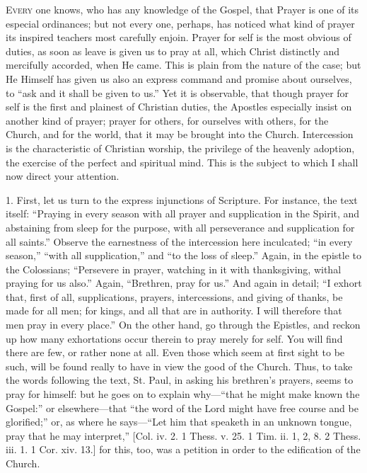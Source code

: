 E\textsc{very} one knows, who has any knowledge of the Gospel, that Prayer
is one of its especial ordinances; but not every one, perhaps, has
noticed what kind of prayer its inspired teachers most carefully
enjoin. Prayer for self is the most obvious of duties, as soon as
leave is given us to pray at all, which Christ distinctly and
mercifully accorded, when He came. This is plain from the nature of
the case; but He Himself has given us also an express command and
promise about ourselves, to ``ask and it shall be given to
us.'' Yet it is observable, that though prayer for self is the
first and plainest of Christian duties, the Apostles especially insist
on another kind of prayer; prayer for others, for ourselves with
others, for the Church, and for the world, that it may be brought into
the Church. Intercession is the characteristic of Christian worship,
the privilege of the heavenly adoption, the exercise of the perfect
and spiritual mind. This is the subject to which I shall now direct
your attention.

1. First, let us turn to the express injunctions of Scripture. For
instance, the text itself: ``Praying in every season with all
prayer and supplication in the Spirit, and abstaining from sleep for
the purpose, with all perseverance and supplication for all
saints.'' Observe the earnestness of the intercession here
inculcated; ``in every season,'' ``with all
supplication,'' and ``to the loss of sleep.'' Again, in
the epistle to the Colossians; ``Persevere in prayer, watching in
it with thanksgiving, withal praying for us also.'' Again,
``Brethren, pray for us.'' And again in detail; ``I exhort
that, first of all, supplications, prayers, intercessions, and giving
of thanks, be made for all men; for kings, and all that are in
authority. I will therefore that men pray in every place.'' On
the other hand, go through the Epistles, and reckon up how many
exhortations occur therein to pray merely for self. You will find
there are few, or rather none at all. Even those which seem at first
sight to be such, will be found really to have in view the good of the
Church. Thus, to take the words following the text, St. Paul, in
asking his brethren's prayers, seems to pray for himself: but he
goes on to explain why—``that he might make known the
Gospel:'' or elsewhere—that ``the word of the Lord might
have free course and be glorified;'' or, as where he says—``Let
him that speaketh in an unknown tongue, pray that he may
interpret,'' [Col. iv. 2. 1 Thess. v. 25. 1 Tim. ii. 1, 2, 8. 2
Thess. iii. 1. 1 Cor. xiv. 13.] for this, too, was a petition in order
to the edification of the Church.

